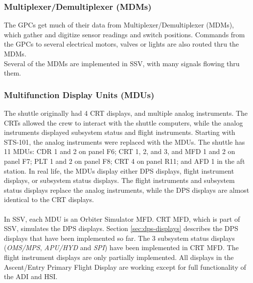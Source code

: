 \documentclass[Space_Shuttle_Vessel_Manual.tex]{subfiles}
\begin{document}
\begin{multicols*}{2}
\subsubsection{Multiplexer/Demultiplexer (MDMs)}
The GPCs get much of their data from Multiplexer/Demultiplexer (MDMs), which gather and digitize sensor readings and switch positions. Commands from the GPCs to several electrical motors, valves or lights are also routed thru the MDMs.\\
Several of the MDMs are implemented in SSV, with many signals flowing thru them.


\subsubsection{Multifunction Display Units (MDUs)}
The shuttle originally had 4 CRT displays, and multiple analog instruments.
The CRTs allowed the crew to interact with the shuttle computers, while the analog instruments displayed subsystem status and flight instruments.
Starting with STS-101, the analog instruments were replaced with the MDUs.
The shuttle has 11 MDUs: CDR 1 and 2 on panel F6; CRT 1, 2, and 3, and MFD 1 and 2 on panel F7; PLT 1 and 2 on panel F8; CRT 4 on panel R11; and AFD 1 in the aft station.
In real life, the MDUs display either DPS displays, flight instrument displays, or subsystem status displays.
The flight instruments and subsystem status displays replace the analog instruments, while the DPS displays are almost identical to the CRT displays.\\
\\
In SSV, each MDU is an Orbiter Simulator MFD. CRT MFD, which is part of SSV, simulates the DPS displays. Section \ref{sec:dps-displays} describes the DPS displays that have been implemented so far.
The 3 subsystem status displays (\textit{OMS/MPS}, \textit{APU/HYD} and \textit{SPI}) have been implemented in CRT MFD.
The flight instrument displays are only partially implemented. All displays in the Ascent/Entry Primary Flight Display are working except for full functionality of the ADI and HSI.
\end{multicols*}
\end{document}
